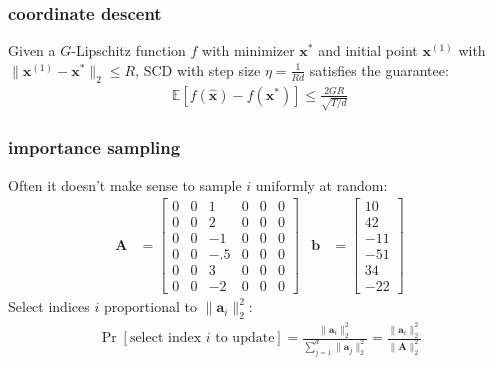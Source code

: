 \documentclass[compress]{beamer}
\newcommand{\bv}[1]{\mathbf{#1}}
\newcommand{\E}{\mathbb{E}}
\begin{document}
\begin{frame}[t]
	\frametitle{coordinate descent}
	\begin{theorem}
		Given a $G$-Lipschitz function $f$ with minimizer $\bv{x}^*$ and initial point $\bv{x}^{(1)} $ with $\|\bv{x}^{(1)} - \bv{x}^*\|_2 \leq R$, SCD with step size $\eta = \frac{1}{Rd}$ satisfies the guarantee:
		\begin{align*}
			\E[f(\hat{\bv{x}}) - f({\bv{x}^*})] \leq \frac{2GR}{\sqrt{T/d}}
		\end{align*}
	\end{theorem}
\end{frame}

\begin{frame}[t]
	\frametitle{importance sampling}
	Often it doesn't make sense to sample $i$ uniformly at random:
	\begin{align*}
		\bv{A} &= \begin{bmatrix} 
			0 & 0 & 1 & 0 & 0 & 0 \\
			0 & 0 & 2 & 0 & 0 & 0 \\
			0 & 0 & -1 & 0 & 0 & 0 \\
			0 & 0 & -.5 & 0 & 0 & 0 \\
			0 & 0 & 3 & 0 & 0 & 0 \\
			0 & 0 & -2 & 0 & 0 & 0 
		\end{bmatrix} & 
		\bv{b} &=\begin{bmatrix} 
			10  \\
			42 \\
			-11  \\
			-51 \\
			34\\
			-22 
		\end{bmatrix} 
	\end{align*}
	Select indices $i$ proportional to $\|\bv{a}_i\|_2^2$:
	\begin{align*}
		\Pr[\text{select index $i$ to update}] = \frac{\|\bv{a}_i\|_2^2}{\sum_{j=1}^d \|\bv{a}_j\|_2^2} = \frac{\|\bv{a}_i\|_2^2}{\|\bv{A}\|_2^2} 
	\end{align*}
\end{frame}
\end{document}
